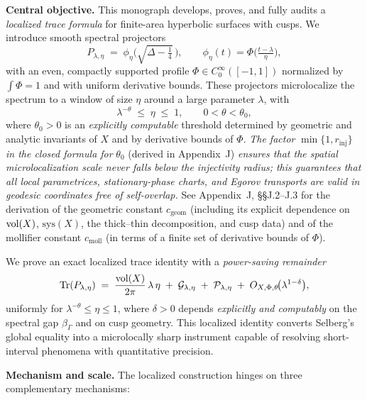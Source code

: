 \medskip

\noindent\textbf{Central objective.}
This monograph develops, proves, and fully audits a \emph{localized trace formula}
for finite-area hyperbolic surfaces with cusps. We introduce smooth spectral
projectors
\[
  P_{\lambda,\eta} \;=\; \phi_\eta\!\Big(\sqrt{\Delta-\tfrac14}\,\Big),
  \qquad \phi_\eta(t)=\Phi\!\Big(\tfrac{t-\lambda}{\eta}\Big),
\]
with an even, compactly supported profile $\Phi\in C_0^\infty([-1,1])$ normalized
by $\int\Phi=1$ and with uniform derivative bounds. These projectors microlocalize
the spectrum to a window of size $\eta$ around a large parameter $\lambda$, with
\[
  \lambda^{-\theta}\;\le\;\eta\;\le\;1, \qquad 0<\theta<\theta_0,
\]
where $\theta_0>0$ is an \emph{explicitly computable} threshold determined by
geometric and analytic invariants of $X$ and by derivative bounds of $\Phi$.
\emph{The factor} $\min\{1,r_{\mathrm{inj}}\}$ \emph{in the closed formula for} $\theta_0$
(derived in Appendix~J) \emph{ensures that the spatial microlocalization scale never falls
below the injectivity radius; this guarantees that all local parametrices, stationary-phase charts,
and Egorov transports are valid in geodesic coordinates free of self-overlap.}
See Appendix~J, §§J.2–J.3 for the derivation of the geometric constant $c_{\mathrm{geom}}$
(including its explicit dependence on $\operatorname{vol}(X)$, $\mathrm{sys}(X)$, the thick–thin decomposition,
and cusp data) and of the mollifier constant $c_{\mathrm{moll}}$ (in terms of a finite set of
derivative bounds of $\Phi$).

We prove an exact localized trace identity with a \emph{power-saving remainder}
\[
  \operatorname{Tr}(P_{\lambda,\eta})
  \;=\;
  \frac{\operatorname{vol}(X)}{2\pi}\,\lambda\,\eta
  \;+\;
  \mathcal{G}_{\lambda,\eta}
  \;+\;
  \mathcal{P}_{\lambda,\eta}
  \;+\;
  O_{X,\Phi,\theta}\!\big(\lambda^{1-\delta}\big),
\]
uniformly for $\lambda^{-\theta}\le\eta\le 1$, where $\delta>0$ depends
\emph{explicitly and computably} on the spectral gap $\beta_\Gamma$ and on cusp
geometry. This localized identity converts Selberg’s global equality into a
microlocally sharp instrument capable of resolving short-interval phenomena with
quantitative precision.

\medskip

\noindent\textbf{Mechanism and scale.}
The localized construction hinges on three complementary mechanisms:

